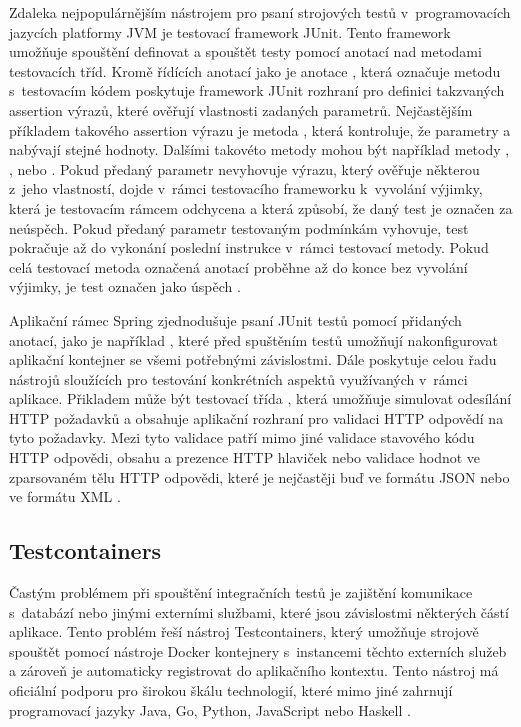 Zdaleka nejpopulárnějším nástrojem pro psaní strojových testů v~programovacích jazycích platformy JVM je testovací framework JUnit. Tento framework umožňuje spouštění definovat a spouštět testy pomocí anotací nad metodami testovacích tříd. Kromě řídících anotací jako je anotace , která označuje metodu s~testovacím kódem poskytuje framework JUnit rozhraní pro definici takzvaných assertion výrazů, které ověřují vlastnosti zadaných parametrů. Nejčastějším příkladem takového assertion výrazu je metoda  , která kontroluje, že parametry  a  nabývají stejné hodnoty. Dalšími takovéto metody mohou být například metody , ,  nebo . Pokud předaný parametr nevyhovuje výrazu, který ověřuje některou z~jeho vlastností, dojde v~rámci testovacího frameworku k~vyvolání výjimky, která je testovacím rámcem odchycena a která způsobí, že daný test je označen za neúspěch. Pokud předaný parametr testovaným podmínkám vyhovuje, test pokračuje až do vykonání poslední instrukce v~rámci testovací metody. Pokud celá testovací metoda označená anotací  proběhne až do konce bez vyvolání výjimky, je test označen jako úspěch \cite{gulati_junit_2017}.

Aplikační rámec Spring zjednodušuje psaní JUnit testů pomocí přidaných anotací, jako je například , které před spuštěním testů umožňují nakonfigurovat aplikační kontejner se všemi potřebnými závislostmi. Dále poskytuje celou řadu nástrojů sloužících pro testování konkrétních aspektů využívaných v~rámci aplikace. Přikladem může být testovací třída , která umožňuje simulovat odesílání HTTP požadavků a obsahuje aplikační rozhraní pro validaci HTTP odpovědí na tyto požadavky. Mezi tyto validace patří mimo jiné validace stavového kódu HTTP odpovědi, obsahu a prezence HTTP hlaviček nebo validace hodnot ve zparsovaném tělu HTTP odpovědi, které je nejčastěji buď ve formátu JSON nebo ve formátu XML \cite{Heckler_2021}.

\subsection{Testcontainers}

Častým problémem při spouštění integračních testů je zajištění komunikace s~databází nebo jinými externími službami, které jsou závislostmi některých částí aplikace. Tento problém řeší nástroj Testcontainers, který umožňuje strojově spouštět pomocí nástroje Docker kontejnery s~instancemi těchto externích služeb a zároveň je automaticky registrovat do aplikačního kontextu. Tento nástroj má oficiální podporu pro širokou škálu technologií, které mimo jiné zahrnují programovací jazyky Java, Go, Python, JavaScript nebo Haskell \cite{North_Egorov_Wittek_2021}.

